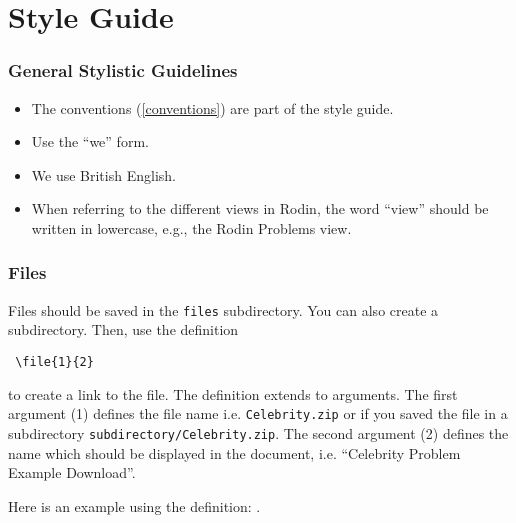 \section{Style Guide}
\label{style-guide}


\subsubsection{General Stylistic Guidelines}

\begin{itemize}
	\item The conventions (\ref{conventions}) are part of the style guide.

	\item Use the ``we'' form.

	\item We use British English.

	\item When referring to the different views in Rodin, the word ``view'' should be written in lowercase, e.g., the Rodin Problems view.
\end{itemize}

\subsubsection{Files}

Files should be saved in the \texttt{files} subdirectory. You can also create a subdirectory. Then, use the definition 

\begin{verbatim} \file{1}{2} 
\end{verbatim} 

to create a link to the file. The definition extends to arguments. The first argument (1) defines the file name i.e. \texttt{Celebrity.zip} or if you saved the file in a subdirectory \texttt{subdirectory/Celebrity.zip}. The second argument (2) defines the name which should be displayed in the document, i.e. ``Celebrity Problem Example Download''.


Here is an example using the definition: .


